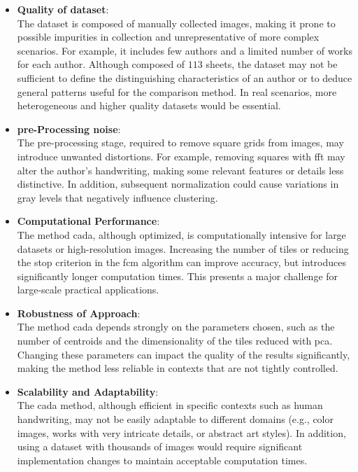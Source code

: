 \begin{toReview}
\begin{itemize}
	\item \textbf{Quality of dataset}:\\ The dataset is composed of manually collected images, making it prone to possible impurities in collection and unrepresentative of more complex scenarios. For example, it includes few authors and a limited number of works for each author. Although composed of $113$ sheets, the dataset may not be sufficient to define the distinguishing characteristics of an author or to deduce general patterns useful for the comparison method. In real scenarios, more heterogeneous and higher quality datasets would be essential.
	\item \textbf{pre-Processing noise}:\\ The pre-processing stage, required to remove square grids from images, may introduce unwanted distortions. For example, removing squares with \gls{fft} may alter the author's handwriting, making some relevant features or details less distinctive. In addition, subsequent normalization could cause variations in gray levels that negatively influence clustering.
	\item \textbf{Computational Performance}:\\ The method \gls{cada}, although optimized, is computationally intensive for large datasets or high-resolution images. Increasing the number of tiles or reducing the stop criterion in the \gls{fcm} algorithm can improve accuracy, but introduces significantly longer computation times. This presents a major challenge for large-scale practical applications.
	\item \textbf{Robustness of Approach}:\\ The method \gls{cada} depends strongly on the parameters chosen, such as the number of centroids and the dimensionality of the tiles reduced with \gls{pca}. Changing these parameters can impact the quality of the results significantly, making the method less reliable in contexts that are not tightly controlled.
	\item \textbf{Scalability and Adaptability}:\\ The \gls{cada} method, although efficient in specific contexts such as human handwriting, may not be easily adaptable to different domains (e.g., color images, works with very intricate details, or abstract art styles). In addition, using a dataset with thousands of images would require significant implementation changes to maintain acceptable computation times.
\end{itemize}


\end{toReview}
